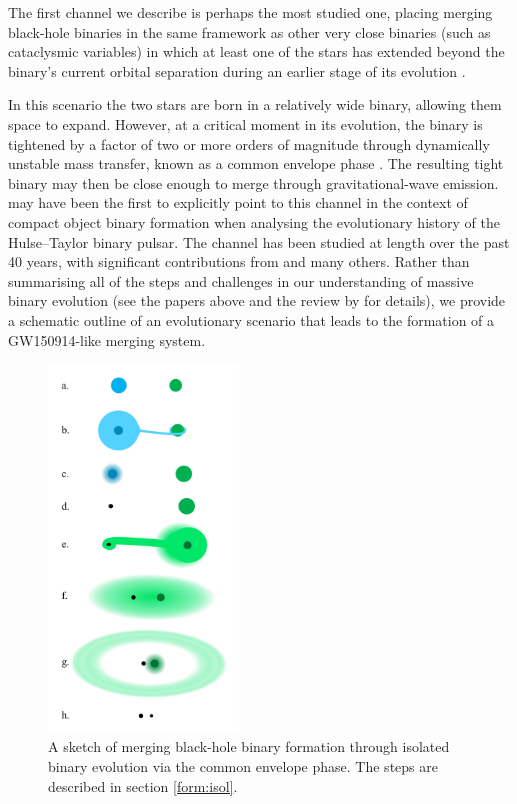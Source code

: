 \documentclass[review]{elsarticle}
\begin{document}
The first channel we describe is perhaps the most studied one, placing merging black-hole binaries in the same framework as other very close binaries (such as cataclysmic variables) in which at least one of the stars has extended beyond the binary's current orbital separation during an earlier stage of its evolution \citep[e.g.,][]{Paczynski:1976}. 

In this scenario the two stars are born in a relatively wide binary, allowing them space to expand.  However, at a critical moment in its evolution, the binary is tightened by a factor of two or more orders of magnitude through dynamically unstable mass transfer, known as a common envelope phase \citep{LivioSoker:1988,Ivanova:2013}. The resulting tight binary may then be close enough to merge through gravitational-wave emission.  \citet{SmarrBlandford:1976} may have been the first to explicitly point to this channel in the context of compact object binary formation when analysing the evolutionary history of the Hulse--Taylor binary pulsar. The channel has been studied at length over the past 40 years, with significant contributions from \citet{TutukovYungelson:1993,Lipunov:1997,BetheBrown:1998,Nelemans:2001,Belczynski:2002,VossTauris:2003,Pfahl:2005,Dewi:2006,Kalogera:2007,OShaughnessy:2008,Dominik:2012,Mennekens:2014,Belczynski:2016,EldridgeStanway:2016} and many others. Rather than summarising all of the steps and challenges in our understanding of massive binary evolution (see the papers above and the review by \citet{PostnovYungelson:2014} for details), we provide a schematic outline of an evolutionary scenario that leads to the formation of a GW150914-like merging system.

\begin{figure}
	\centering
	\includegraphics[width=0.45\textwidth]{channel1.png}
	\caption{\label{fig:isol_binary} A sketch of merging black-hole binary formation through isolated binary evolution via the common envelope phase.  The steps are described in section \ref{form:isol}.}
\end{figure}
\end{document}
